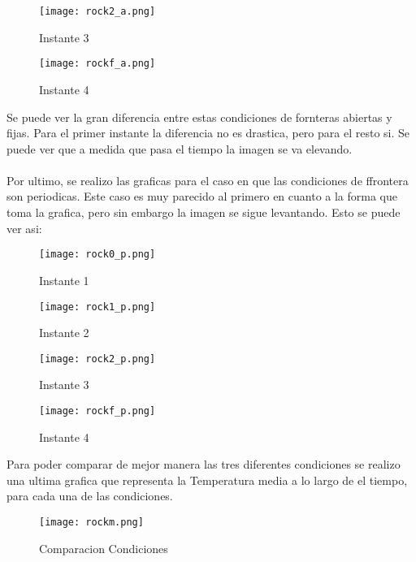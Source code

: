 \documentclass{article}[11]
\begin{document}
\begin{figure}[H]
    \centering
    \texttt{[image: rock2\_a.png]}
    \caption{Instante 3}
    \label{fig:my_label}
\end{figure}

\begin{figure}[H]
    \centering
    \texttt{[image: rockf\_a.png]}
    \caption{Instante 4}
    \label{fig:my_label}
\end{figure}

Se puede ver la gran diferencia entre estas condiciones de fornteras abiertas y fijas. Para el primer instante la diferencia no es drastica, pero para el resto si. Se puede ver que a medida que pasa el tiempo la imagen se va elevando.
\\
\\
Por ultimo, se realizo las graficas para el caso en que las condiciones de ffrontera son periodicas. Este caso es muy parecido al primero en cuanto a la forma que toma la grafica, pero sin embargo la imagen se sigue levantando. Esto se puede ver asi:
\begin{figure}[H]
    \centering
    \texttt{[image: rock0\_p.png]}
    \caption{Instante 1}
    \label{fig:my_label}
\end{figure}

\begin{figure}[H]
    \centering
    \texttt{[image: rock1\_p.png]}
    \caption{Instante 2}
    \label{fig:my_label}
\end{figure}

\begin{figure}[H]
    \centering
    \texttt{[image: rock2\_p.png]}
    \caption{Instante 3}
    \label{fig:my_label}
\end{figure}

\begin{figure}[H]
    \centering
    \texttt{[image: rockf\_p.png]}
    \caption{Instante 4}
    \label{fig:my_label}
\end{figure}

    
Para poder comparar de mejor manera las tres diferentes condiciones se realizo una ultima grafica que representa la Temperatura media a lo largo de el tiempo, para cada una de las condiciones.
\begin{figure}[H]
    \centering
    \texttt{[image: rockm.png]}
    \caption{Comparacion Condiciones}
    \label{fig:my_label}
\end{figure}    
\end{document}

